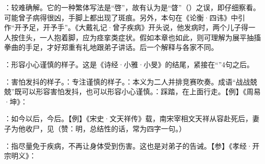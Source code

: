 {
\item {}：较难确解。它的一种繁体写法是“啓”，故有认为是“{䁈}”（）之误，即仔细察看。可能曾子病得很凶，手脚上都出现了斑痕。另外，本句在《论衡·四讳》中引作“开予足，开予手”。《大戴礼记·曾子疾病》开头说，他发病时，两个儿子得一人按住头，一人抱着脚，应为痉挛类症状。假如本章也如此，则可理解为展平抽搐拳曲的手足，才好郑重有礼地跟弟子讲话。后一个解释与各家不同。

\item {}：形容小心谨慎的样子。这是《诗经·小雅·小旻》的结尾，紧接在“”4句之后。

：害怕发抖的样子。：专注谨慎的样子。：本义为二人并排竞赛吹奏。成语“战战兢兢”既可以形容害怕发抖，也可以形容小心谨慎。：踩踏，在上面行走。【例】《周易·坤》：
\item {}：如今以后，今后。【例】《宋史·文天祥传》载，南宋宰相文天祥从容赴死后，妻子为他收尸，见（赞：明，总结性的话，常为四字一句。）
\item {}：指尽量免于疾病，不再让身体受到伤害。这也是对弟子的告诫。【参】《孝经·开宗明义》：
}
{}


